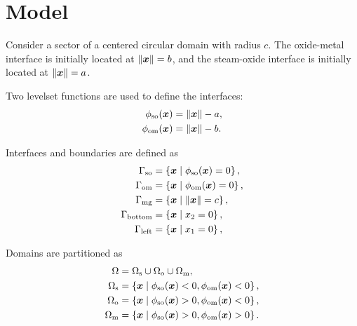 \section{Model}
\label{s: model}

Consider a sector of a centered circular domain with radius $c$. The oxide-metal interface is initially located at $\left\lVert\boldsymbol{x}\right\rVert=b$, and the steam-oxide interface is initially located at $\left\lVert\boldsymbol{x}\right\rVert=a$.

Two levelset functions are used to define the interfaces:
\begin{align}
  \phi_\text{so}(\boldsymbol{x}) & = \left\lVert\boldsymbol{x}\right\rVert-a, \\
  \phi_\text{om}(\boldsymbol{x}) & = \left\lVert\boldsymbol{x}\right\rVert-b.
\end{align}

Interfaces and boundaries are defined as
\begin{align}
  \Gamma_\text{so}     & = \left\{ \boldsymbol{x} \mid \phi_\text{so}(\boldsymbol{x}) = 0 \right\}, \\
  \Gamma_\text{om}     & = \left\{ \boldsymbol{x} \mid \phi_\text{om}(\boldsymbol{x}) = 0 \right\}, \\
  \Gamma_\text{mg}     & = \left\{ \boldsymbol{x} \mid \left\lVert\boldsymbol{x}\right\rVert = c \right\},          \\
  \Gamma_\text{bottom} & = \left\{ \boldsymbol{x} \mid x_2 = 0 \right\},                  \\
  \Gamma_\text{left}   & = \left\{ \boldsymbol{x} \mid x_1 = 0 \right\},
\end{align}

Domains are partitioned as
\begin{align}
  \Omega          & = \Omega_\text{s} \cup \Omega_\text{o} \cup \Omega_\text{m},                     \\
  \Omega_\text{s} & = \left\{ \boldsymbol{x} \mid \phi_\text{so}(\boldsymbol{x}) < 0, \phi_\text{om}(\boldsymbol{x}) < 0 \right\}, \\
  \Omega_\text{o} & = \left\{ \boldsymbol{x} \mid \phi_\text{so}(\boldsymbol{x}) > 0, \phi_\text{om}(\boldsymbol{x}) < 0 \right\}, \\
  \Omega_\text{m} & = \left\{ \boldsymbol{x} \mid \phi_\text{so}(\boldsymbol{x}) > 0, \phi_\text{om}(\boldsymbol{x}) > 0 \right\}.
\end{align}

